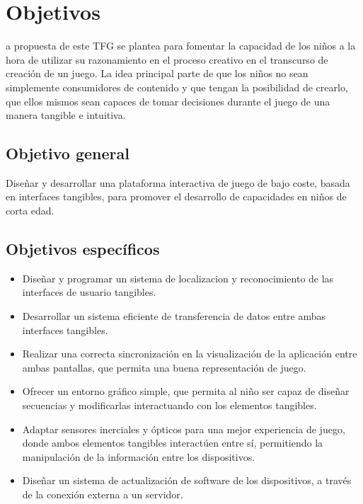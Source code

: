 \chapter{Objetivos}
\label{chap:objetivos}

\noindent
{}a propuesta de este TFG se plantea para fomentar la capacidad de los niños a la hora de utilizar su
razonamiento en el proceso creativo en el transcurso de creación de un juego. La idea principal parte de que los niños no sean simplemente consumidores de contenido y que tengan la posibilidad de crearlo, que ellos mismos sean capaces de tomar decisiones durante el juego de una manera tangible e intuitiva. 





\section{Objetivo general}

Diseñar y desarrollar una plataforma interactiva de juego de bajo coste, basada en interfaces tangibles, para promover el desarrollo de capacidades en niños de corta edad.

\section{Objetivos específicos}

\begin{itemize}
\item Diseñar y programar un sistema de localizacion y reconocimiento de las interfaces de usuario tangibles.

\item Desarrollar un sistema eficiente de transferencia de datos entre ambas interfaces tangibles.

\item Realizar una correcta sincronización en la visualización de la aplicación entre ambas pantallas, que permita una buena representación de juego.

\item Ofrecer un entorno gráfico simple, que permita al niño ser capaz de diseñar secuencias y modificarlas interactuando con los elementos tangibles.

\item Adaptar sensores inerciales y ópticos para una mejor experiencia de juego, donde ambos elementos tangibles interactúen entre sí, permitiendo la manipulación de la información entre los dispositivos.

\item Diseñar un sistema de actualización de software de los dispositivos, a través de la conexión externa a un servidor.
\end{itemize}



